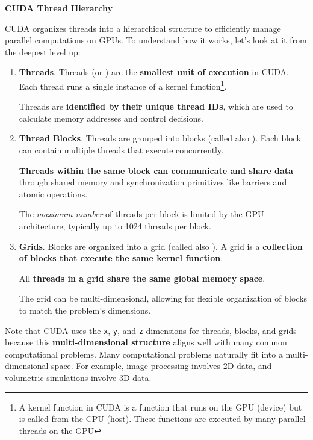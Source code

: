 \highspace
\begin{flushleft}
    \textcolor{Green3}{ \textbf{CUDA Thread Hierarchy}}
\end{flushleft}
CUDA organizes threads into a hierarchical structure to efficiently manage parallel computations on GPUs. To understand how it works, let's look at it from the deepest level up:
\begin{enumerate}
    \item \textbf{Threads}. Threads (or ) are the \textbf{smallest unit of execution} in CUDA. Each thread runs a single instance of a kernel function\footnote{A kernel function in CUDA is a function that runs on the GPU (device) but is called from the CPU (host). These functions are executed by many parallel threads on the GPU}.
    
    Threads are \textbf{identified by their unique thread IDs}, which are used to calculate memory addresses and control decisions.
    

    \item \textbf{Thread Blocks}. Threads are grouped into blocks (called also ). Each block can contain multiple threads that execute concurrently.
    
    \textbf{Threads within the same block can communicate and share data} through shared memory and synchronization primitives like barriers and atomic operations.
    
    The \emph{maximum number} of threads per block is limited by the GPU architecture, typically up to 1024 threads per block.
    
    \label{definition: CUDA Grids}
    \item \textbf{Grids}. Blocks are organized into a grid (called also ). A grid is a \textbf{collection of blocks that execute the same kernel function}.
    
    All \textbf{threads in a grid share the same global memory space}.
    
    The grid can be multi-dimensional, allowing for flexible organization of blocks to match the problem's dimensions.
\end{enumerate}
Note that CUDA uses the \texttt{x}, \texttt{y}, and \texttt{z} dimensions for threads, blocks, and grids because this \textbf{multi-dimensional structure} aligns well with many common computational problems. Many computational problems naturally fit into a multi-dimensional space. For example, image processing involves 2D data, and volumetric simulations involve 3D data.

